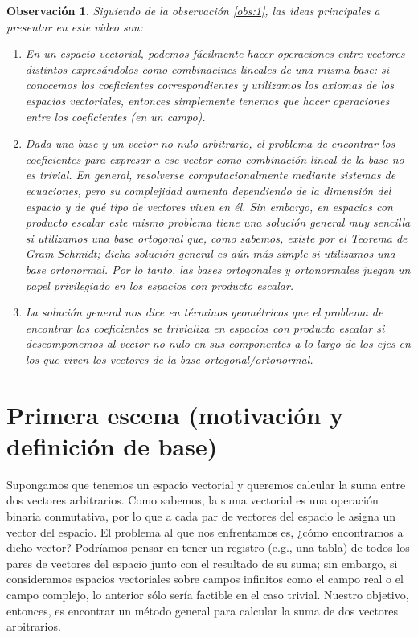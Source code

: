 \documentclass[12pt,dvipsnames]{article}
\newtheorem{obs}{Observación}[section]
\numberwithin{equation}{section}
\begin{document}
\begin{obs}
Siguiendo de la observación \ref{obs:1}, las ideas principales a presentar en este video son:

\begin{enumerate}[label=(\roman*)]
    \item En un espacio vectorial, podemos fácilmente hacer operaciones entre vectores distintos expresándolos como combinacines lineales de una misma base: si conocemos los coeficientes correspondientes y utilizamos los axiomas de los espacios vectoriales, entonces simplemente tenemos que hacer operaciones entre los coeficientes (en un campo).
    
    \item Dada una base y un vector no nulo arbitrario, el problema de encontrar los coeficientes para expresar a ese vector como combinación lineal de la base no es trivial. En general, resolverse computacionalmente mediante sistemas de ecuaciones, pero su complejidad aumenta dependiendo de la dimensión del espacio y de qué tipo de vectores viven en él. Sin embargo, en espacios con producto escalar este mismo problema tiene una solución general muy sencilla  si utilizamos una base ortogonal \textemdash que, como sabemos, existe por el Teorema de Gram-Schmidt\textemdash; dicha solución general es aún más simple si utilizamos una base ortonormal. Por lo tanto, las bases ortogonales y ortonormales juegan un papel privilegiado en los espacios con producto escalar.
    
    \item La solución general nos dice en términos geométricos que el problema de encontrar los coeficientes se trivializa en espacios con producto escalar si descomponemos al vector no nulo en sus componentes a lo largo de los ejes en los que viven los vectores de la base ortogonal/ortonormal.
\end{enumerate}
\end{obs}

\newpage
\section{Primera escena (motivación y definición de base)}

Supongamos que tenemos un espacio vectorial y queremos calcular la suma entre dos vectores arbitrarios. Como sabemos, la suma vectorial es una operación binaria conmutativa, por lo que a cada par de vectores del espacio le asigna un vector del espacio. El problema al que nos enfrentamos es, ¿cómo encontramos a dicho vector? Podríamos pensar en tener un registro (e.g., una tabla) de todos los pares de vectores del espacio junto con el resultado de su suma; sin embargo, si consideramos espacios vectoriales sobre campos infinitos \textemdash como el campo real o el campo complejo\textemdash, lo anterior sólo sería factible en el caso trivial. Nuestro objetivo, entonces, es encontrar un método general para calcular la suma de dos vectores arbitrarios.
\end{document}
